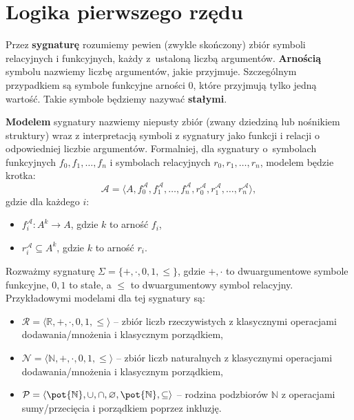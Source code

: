 \section{Logika pierwszego rzędu}

Przez \textbf{sygnaturę} rozumiemy pewien (zwykle skończony) zbiór symboli relacyjnych i funkcyjnych, każdy z~ustaloną liczbą argumentów. \textbf{Arnością} symbolu nazwiemy liczbę argumentów, jakie przyjmuje. Szczególnym przypadkiem są symbole funkcyjne arności 0, które przyjmują tylko jedną wartość. Takie symbole będziemy nazywać \textbf{stałymi}.

\textbf{Modelem} sygnatury nazwiemy niepusty zbiór (zwany dziedziną lub nośnikiem struktury) wraz z interpretacją symboli z sygnatury jako funkcji i relacji o odpowiedniej liczbie argumentów. Formalniej, dla sygnatury o~symbolach funkcyjnych $f_0, f_1, \ldots, f_n$ i symbolach relacyjnych $r_0, r_1, \ldots, r_n$, modelem będzie krotka:
\[
\mathcal{A} = \langle A, f^{\mathcal{A}}_0, f^{\mathcal{A}}_1, \ldots, f^{\mathcal{A}}_n, r^{\mathcal{A}}_0, r^{\mathcal{A}}_1, \ldots, r^{\mathcal{A}}_n \rangle,
\]
gdzie dla każdego $i$:
\begin{itemize}
\item $f^{\mathcal{A}}_i: A^k \to A$, gdzie $k$ to arność $f_i$,
\item $r^{\mathcal{A}}_i \subseteq A^k$, gdzie $k$ to arność $r_i$.
\end{itemize}

\begin{example}
Rozważmy sygnaturę $\Sigma = \{ +, \cdot, 0, 1, \leqslant \}$, gdzie $+, \cdot$ to dwuargumentowe symbole funkcyjne, $0, 1$ to stałe, a $\leqslant$ to dwuargumentowy symbol relacyjny. Przykładowymi modelami dla tej sygnatury są: 
\begin{itemize}
\item $\mathcal{R} = \langle \mathbb{R}, +, \cdot, 0, 1, \leqslant \rangle$ -- zbiór liczb rzeczywistych z klasycznymi operacjami dodawania/mnożenia i klasycznym porządkiem,
\item $\mathcal{N} = \langle \mathbb{N}, +, \cdot, 0, 1, \leqslant \rangle$ -- zbiór liczb naturalnych z klasycznymi operacjami dodawania/mnożenia i klasycznym porządkiem,
\item $\mathcal{P} = \langle \pot{\mathbb{N}}, \cup, \cap, \varnothing, \pot{\mathbb{N}}, \subseteq \rangle$ -- rodzina podzbiorów $\mathbb{N}$ z operacjami sumy/przecięcia i porządkiem poprzez inkluzję.
\end{itemize}
\end{example}

